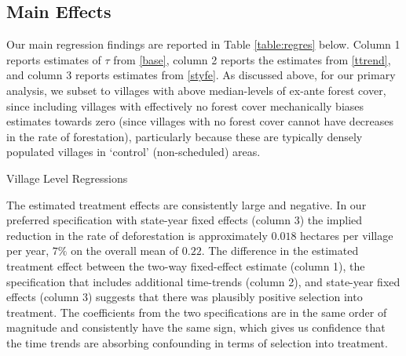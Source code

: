 \documentclass[12pt,reqno]{article}
\begin{document}
\subsection{Main Effects}
Our main regression findings are reported in Table \ref{table:regres} below. Column 1 reports estimates of $\tau$ from \ref{base}, column 2 reports the estimates from \ref{ttrend}, and column 3 reports estimates from \ref{styfe}. As discussed above, for our primary analysis, we subset to villages with above median-levels of ex-ante forest cover, since including villages with effectively no forest cover mechanically biases estimates towards zero (since villages with no forest cover cannot have decreases in the rate of forestation), particularly because these are typically densely populated villages in `control' (non-scheduled) areas.


\begin{centering}
\begin{table}[!htbp] \centering
  \caption{Village Level Regressions}
  \label{table:regres}
  
\end{table}
\end{centering}


The estimated treatment effects are consistently large and negative.
In our preferred specification with state-year fixed effects (column 3) the implied reduction in the rate of deforestation is approximately $0.018$ hectares per village per year, $7\%$ on the overall mean of $0.22$. 
The difference in the
estimated treatment effect between the two-way fixed-effect estimate
(column 1), the specification that includes additional time-trends
(column 2), and state-year fixed effects (column 3) suggests that
there was plausibly positive selection into treatment. The
coefficients from the two specifications are in the same order of
magnitude and consistently have the same sign, which gives us
confidence that the time trends are absorbing confounding in terms of selection
into treatment.



\end{document}

